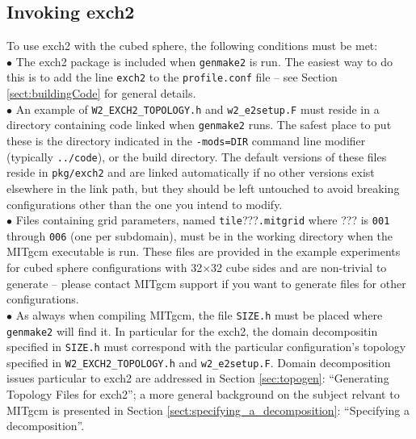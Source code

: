 \subsection{Invoking exch2}

To use exch2 with the cubed sphere, the following conditions must be
met: \\

$\bullet$ The exch2 package is included when \texttt{genmake2} is run.  The
  easiest way to do this is to add the line \texttt{exch2} to the
  \texttt{profile.conf} file -- see Section \ref{sect:buildingCode}
  for general details. \\

$\bullet$ An example of \texttt{W2\_EXCH2\_TOPOLOGY.h} and
  \texttt{w2\_e2setup.F} must reside in a directory containing code
  linked when \texttt{genmake2} runs.  The safest place to put these
  is the directory indicated in the \texttt{-mods=DIR} command line
  modifier (typically \texttt{../code}), or the build directory.  The
  default versions of these files reside in \texttt{pkg/exch2} and are
  linked automatically if no other versions exist elsewhere in the
  link path, but they should be left untouched to avoid breaking
  configurations other than the one you intend to modify.\\

$\bullet$ Files containing grid parameters, named
  \texttt{tile}???\texttt{.mitgrid} where ??? is \texttt{001} through
  \texttt{006} (one per subdomain), must be in the working directory
  when the MITgcm executable is run.  These files are provided in the
  example experiments for cubed sphere configurations with
  32$\times$32 cube sides and are non-trivial to generate -- please
  contact MITgcm support if you want to generate files for other
  configurations. \\

$\bullet$ As always when compiling MITgcm, the file \texttt{SIZE.h}
  must be placed where \texttt{genmake2} will find it.  In particular
  for the exch2, the domain decompositin specified in \texttt{SIZE.h}
  must correspond with the particular configuration's topology
  specified in \texttt{W2\_EXCH2\_TOPOLOGY.h} and
  \texttt{w2\_e2setup.F}.  Domain decomposition issues particular to
  exch2 are addressed in Section \ref{sec:topogen}: ``Generating
  Topology Files for exch2''; a more general background on the subject
  relvant to MITgcm is presented in Section
  \ref{sect:specifying_a_decomposition}: ``Specifying a
  decomposition''.\\

